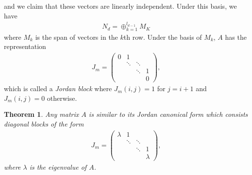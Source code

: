 \documentclass[10pt]{book}
\newtheorem{theorem}{Theorem}[chapter]
\theoremstyle{definition}
\numberwithin{equation}{chapter}
\begin{document}
and we claim that these vectors are linearly independent. Under this basis, we have 
\begin{align*}
    N_d = \oplus^{l_{d-1}}_{k=1} M_K
\end{align*}
where $M_k$ is the span of vectors in the $k$th row. Under the basis of $M_k$, $A$ has the representation
\begin{align*}
    J_m = \begin{pmatrix}
    0 & 1 &  &  \\
     &\ddots & \ddots & \\
     &   & \ddots & 1 \\
     &  &  & 0
    \end{pmatrix},
\end{align*}
which is called a \emph{Jordan block} where $J_m(i,j) = 1$ for $j = i+1$ and $J_m(i,j) = 0$ otherwise.

\medskip

\begin{theorem}
Any matrix $A$ is similar to its Jordan canonical form which consists diagonal blocks of the form 
\begin{align*}
    J_m = \begin{pmatrix}
    \lambda & 1 &  &  \\
     &\ddots & \ddots & \\
     &   & \ddots & 1 \\
     &  &  & \lambda
    \end{pmatrix},
\end{align*}
where $\lambda$ is the eigenvalue of $A$.
\end{theorem}

\medskip
\end{document}
